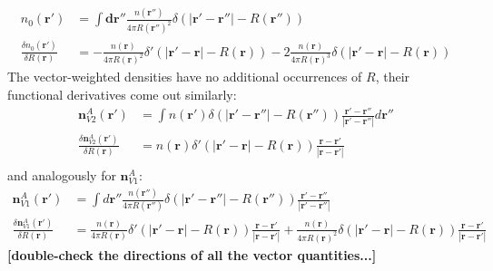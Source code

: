 \documentclass[letterpaper,twocolumn,amsmath,amssymb,jcp,10pt,aip]{revtex4-1}
\newcommand{\red}[1]{{\bf \color{red} #1}}
\newcommand{\rr}{\textbf{r}}
\newcommand{\fixme}[1]{\red{[#1]}}
\begin{document}
\begin{widetext}
\begin{align}
  n_0(\rr') &= \int \mathbf{dr''} \frac{n(\rr'')}{4\pi R(\rr'')^2}
  \delta(|\rr'-\rr''| - R(\rr'')) \\
  \frac{\delta n_0(\rr')}{\delta R(\rr)}
  &= -\frac{n(\rr)}{4\pi
    R(\rr)^2}\delta'(|\rr'-\rr| - R(\rr))
  -
  2\frac{n(\rr)}{4\pi
    R(\rr)^3}\delta(|\rr'-\rr| - R(\rr))
\end{align}
The vector-weighted densities have no additional occurrences of $R$,
their functional derivatives come out similarly:
\begin{align}
  \mathbf{n}_{V2}^{A}(\rr') &= \int n(\rr') \delta(|\rr' - \rr''| - R(\rr''))
    \frac{\rr'-\rr''}{|\rr'-\rr''|} d \rr''\\
  \frac{\delta \mathbf{n}_{V2}^{A}(\rr')}{\delta R(\rr)} &= n(\rr) \delta'(|\rr' - \rr| - R(\rr))
    \frac{\rr-\rr'}{|\rr-\rr'|}\\
\end{align}
and analogously for $\mathbf{n}_{V1}^A$:
\begin{align}
  \mathbf{n}_{V1}^A(\rr') &= \int d\rr'' \frac{n(\rr'')}{4\pi R(\rr'')}
  \delta(|\mathbf{r'}-\rr''| - R(\rr'')) \frac{\rr'-\rr''}{|\rr'-\rr''|}\\
  \frac{\delta \mathbf{n}_{V1}^A(\rr')}{\delta R(\rr)}
  &= \frac{n(\rr)}{4\pi
    R(\rr)}\delta'(|\rr'-\rr| - R(\rr)) \frac{\rr-\rr'}{|\rr-\rr'|}
  +
  \frac{n(\rr)}{4\pi
    R(\rr)^2}\delta(|\rr'-\rr| - R(\rr)) \frac{\rr-\rr'}{|\rr-\rr'|}
\end{align}
\fixme{double-check the directions of all the vector quantities...}


\end{widetext}
\end{document}
